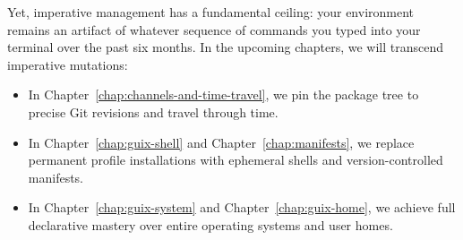 Yet, imperative management has a fundamental ceiling: your environment remains an artifact of whatever sequence of commands you typed into your terminal over the past six months. In the upcoming chapters, we will transcend imperative mutations:
\begin{itemize}
  \item In Chapter~\ref{chap:channels-and-time-travel}, we pin the package tree to precise Git revisions and travel through time.
  \item In Chapter~\ref{chap:guix-shell} and Chapter~\ref{chap:manifests}, we replace permanent profile installations with ephemeral shells and version-controlled manifests.
  \item In Chapter~\ref{chap:guix-system} and Chapter~\ref{chap:guix-home}, we achieve full declarative mastery over entire operating systems and user homes.
\end{itemize}
